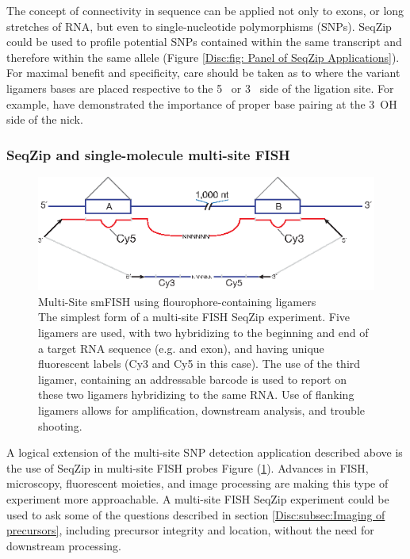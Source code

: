      The concept of connectivity in sequence can be applied not only to exons, or long stretches of RNA, but even to single-nucleotide polymorphisms (SNPs). SeqZip could be used to profile potential SNPs contained within the same transcript and therefore within the same allele (Figure \ref{Disc:fig: Panel of SeqZip Applications}). For maximal benefit and specificity, care should be taken as to where the variant ligamers bases are placed respective to the 5\textprime~ or 3\textprime~ side of the ligation site. For example, \citet{Chauleau2013b} have demonstrated the importance of proper base pairing at the 3\textprime~OH side of the nick.

    \subsubsection{SeqZip and single-molecule multi-site FISH}
      \label{Disc:subsubsec:SeqZip and Single-Molecule FISH}

      \begin{figure} %
        \centering 
        \includegraphics{Figures/Discussion/MultiSiteFish.eps}
        \caption[Multi-Site smFISH using flourophore-containing ligamers]
        {
          Multi-Site smFISH using flourophore-containing ligamers
          \\ [0.25cm]
          The simplest form of a multi-site FISH SeqZip experiment. Five ligamers are used, with two hybridizing to the beginning and end of a target RNA sequence (e.g. and exon), and having unique fluorescent labels (Cy3 and Cy5 in this case). The use of the third ligamer, containing an addressable barcode is used to report on these two ligamers hybridizing to the same RNA. Use of flanking ligamers allows for amplification, downstream analysis, and trouble shooting.
          }
        \label{Disc:fig:MultiSite FISH using SeqZip}
        \end{figure}

      A logical extension of the multi-site SNP detection application described above is the use of SeqZip in multi-site FISH probes Figure (\ref{Disc:fig:MultiSite FISH using SeqZip}). Advances in FISH, microscopy, fluorescent moieties, and image processing are making this type of experiment more approachable. A multi-site FISH SeqZip experiment could be used to ask some of the questions described in section \ref{Disc:subsec:Imaging of precursors}, including precursor integrity and location, without the need for downstream processing.

